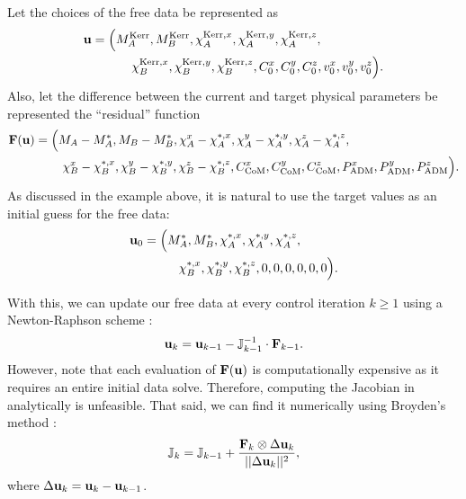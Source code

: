 \documentclass{../document}
\begin{document}
      Let the choices of the free data be represented as
      \begin{equation}
        \begin{aligned}
          {\bf u}
          = \Big(
            M^\text{Kerr}_A,
            M^\text{Kerr}_B,
            \chi^{\text{Kerr},x}_A, \chi^{\text{Kerr},y}_A, \chi^{\text{Kerr},z}_A, \qquad\qquad\quad \\
            \chi^{\text{Kerr},x}_B, \chi^{\text{Kerr},y}_B, \chi^{\text{Kerr},z}_B,
            C_0^x, C_0^y, C_0^z,
            v_0^x, v_0^y, v_0^z
          \Big).
        \end{aligned}
      \end{equation}
      Also, let the difference between the current and target physical parameters be represented the ``residual'' function
      \begin{equation}
        \begin{aligned}
          {\bf F}({\bf u})
          = \Big(
            M_A - M^*_A,
            M_B - M^*_B,
            \chi^x_A - \chi^{*,x}_A, \chi^y_A - \chi^{*,y}_A, \chi^z_A - \chi^{*,z}_A, \qquad\qquad\qquad\qquad\quad \\
            \chi^x_B - \chi^{*,x}_B, \chi^y_B - \chi^{*,y}_B, \chi^z_B - \chi^{*,z}_B,
            C_\text{CoM}^x, C_\text{CoM}^y, C_\text{CoM}^z,
            P_\text{ADM}^x, P_\text{ADM}^y, P_\text{ADM}^z
          \Big).
        \end{aligned}
      \end{equation}
      As discussed in the example above, it is natural to use the target values as an initial guess for the free data:
      \begin{equation}
        \begin{aligned}
          {\bf u}_0
          = \Big(
            M^*_A,
            M^*_B,
            \chi^{*,x}_A, \chi^{*,y}_A, \chi^{*,z}_A, \qquad\quad \\
            \chi^{*,x}_B, \chi^{*,y}_B, \chi^{*,z}_B,
            0, 0, 0,
            0, 0, 0
          \Big).
        \end{aligned}
      \end{equation}

      With this, we can update our free data at every control iteration $k \geq 1$ using a Newton-Raphson scheme \cite{NumericalRecipes}:
      \begin{equation}\label{eq:u-iteration}
        {\bf u}_k = {\bf u}_{k-1} - \mathbb{J}^{-1}_{k-1} \cdot {\bf F}_{k-1}.
      \end{equation}
      However, note that each evaluation of ${\bf F}({\bf u})$ is computationally expensive as it requires an entire initial data solve. Therefore, computing the Jacobian in \eq{\eqref{eq:u-iteration}} analytically is unfeasible. That said, we can find it numerically using Broyden's method \cite{NumericalRecipes}:
      \begin{equation}\label{eq:J-iteration}
        \mathbb{J}_k = \mathbb{J}_{k-1} + \frac{{\bf F}_k \otimes \Delta {\bf u}_k}{||\Delta {\bf u}_k||^2},
      \end{equation}
      where $\Delta {\bf u}_k = {\bf u}_k - {\bf u}_{k-1}$.
\end{document}

